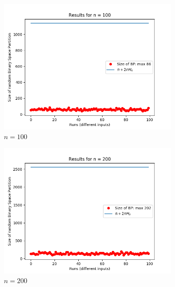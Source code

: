 \documentclass[letterpaper]{article}
\begin{document}
\begin{figure}[H]
\begin{subfigure}{.33\textwidth}
      \includegraphics[width=1\linewidth]{images/assign1/fulltriangle/inputs_100}
      \caption{$n = 100$}
    \end{subfigure}
    \begin{subfigure}{.33\textwidth}
      \centering
      \includegraphics[width=1\linewidth]{images/assign1/fulltriangle/inputs_200}
      \caption{$n = 200$}
    \end{subfigure}
    \begin{subfigure}{.33\textwidth}
      \centering

\end{subfigure}
\end{figure}
\end{document}
